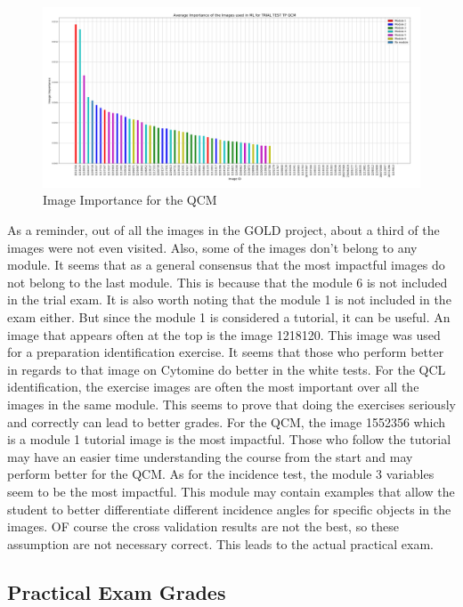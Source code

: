 \documentclass[a4paper,11pt]{report}
\numberwithin{figure}{section} %
\begin{document}
      \begin{figure}[H]
      \centering
      \includegraphics[width=.95\linewidth]{plots/im_importance_TRIAL_TEST_TP_QCM_2018-04-29_14_34_19.png}
      \caption{Image Importance for the QCM}
      \label{fig:im_white3}
      \end{figure}

    As a reminder, out of all the images in the GOLD project, about a third of the images were not even visited.
    Also, some of the images don't belong to any module.
    It seems that as a general consensus that the most impactful images do not belong to the last module.
    This is because that the module 6 is not included in the trial exam.
    It is also worth noting that the module 1 is not included in the exam either.
    But since the module 1 is considered a tutorial, it can be useful.
    An image that appears often at the top is the image 1218120.
    This image was used for a preparation identification exercise.
    It seems that those who perform better in regards to that image on Cytomine do better in the white tests.
    For the QCL identification, the exercise images are often the most important over all the images in the same module.
    This seems to prove that doing the exercises seriously and correctly can lead to better grades.
    For the QCM, the image 1552356 which is a module 1 tutorial image is the most impactful.
    Those who follow the tutorial may have an easier time understanding the course from the start and may perform better for the QCM. As for the incidence test, the module 3 variables seem to be the most impactful.
    This module may contain examples that allow the student to better differentiate different incidence angles for specific objects in the images.
    OF course the cross validation results are not the best, so these assumption are not necessary correct. This leads to the actual practical exam.

    \subsection{Practical Exam Grades}
\end{document}
